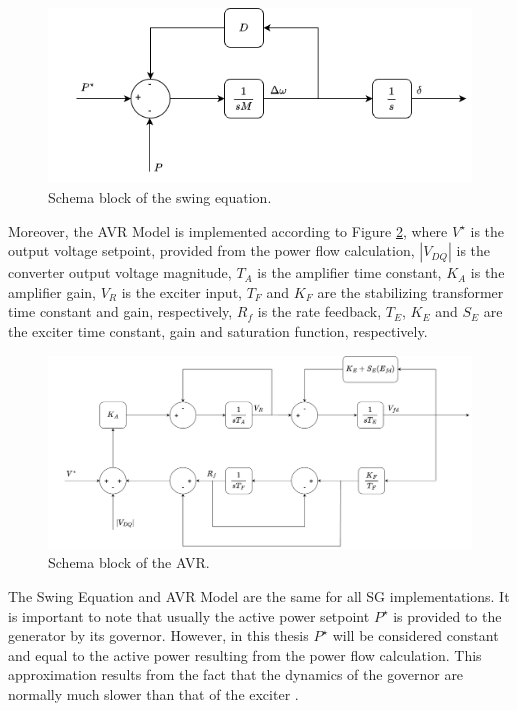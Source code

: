 \begin{figure}[ht!]
    \centering
    \includegraphics[width=12cm]{images/swing_equation_blocks.png}
    \caption{Schema block of the swing equation.}
    \label{fig:swing_equation_blocks}
\end{figure}

Moreover, the AVR Model is implemented according to Figure \ref{fig:avr_blocks},
where $V^{\star}$ is the output voltage setpoint, provided from the power flow
calculation, $|V_{DQ}|$ is the converter output voltage magnitude, $T_A$ is the
amplifier time constant, $K_A$ is the amplifier gain, $V_R$ is the exciter
input, $T_F$ and $K_F$ are the stabilizing transformer time constant and gain,
respectively, $R_f$ is the rate feedback, $T_E$, $K_E$ and $S_E$ are the exciter
time constant, gain and saturation function, respectively.

\begin{figure}[ht!]
    \centering
    \includegraphics[width=12cm]{images/avr_blocks.png}
    \caption{Schema block of the AVR.}
    \label{fig:avr_blocks}
\end{figure}

The Swing Equation and AVR Model are the same for all SG implementations. It is
important to note that usually the active power setpoint $P^{\star}$ is provided
to the generator by its governor. However, in this thesis $P^{\star}$ will be
considered constant and equal to the active power resulting from the power flow
calculation. This approximation results from the fact that the dynamics of the
governor are normally much slower than that of the exciter
\cite{knazkins2004stability}.

